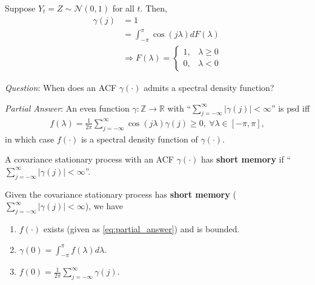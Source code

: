 \documentclass[11pt]{elegantbook}
\begin{document}
\begin{example}
    Suppose $Y_t=Z\sim \mathcal{N}(0,1)$ for all $t$. Then,
    \begin{equation}
        \begin{aligned}
            \gamma(j)&=1\\
            &=\int_{-\pi}^\pi \cos(j\lambda) d F(\lambda)\\
            & \Rightarrow F(\lambda)=
            \left\{\begin{matrix}
                1,&\lambda\geq 0\\
                0,&\lambda<0
            \end{matrix}\right.
        \end{aligned}
        \nonumber
    \end{equation}
\end{example}

\textit{Question}: When does an ACF $\gamma(\cdot)$ admits a spectral density function?

\textit{Partial Answer}: An even function $\gamma: \mathbb{Z}\rightarrow \mathbb{R}$ with ``$\sum_{j=-\infty}^\infty |\gamma(j)|<\infty$'' is psd iff
\begin{equation}
    \begin{aligned}
        f(\lambda)=\frac{1}{2\pi}\sum_{j=-\infty}^\infty \cos\left(j\lambda\right)\gamma(j)\geq 0,\ \forall \lambda\in[-\pi, \pi],
    \end{aligned}
    \label{eq:partial_answer}
\end{equation}
in which case $f(\cdot)$ is a spectral density function of $\gamma(\cdot)$.


\begin{remark}
    A covariance stationary process with an ACF $\gamma(\cdot)$ has \textbf{short memory} if ``$\sum_{j=-\infty}^\infty |\gamma(j)|<\infty$''.
\end{remark}

\begin{proposition}
    Given the covariance stationary process has \textbf{short memory} ($\sum_{j=-\infty}^\infty |\gamma(j)|<\infty$), we have
    \begin{enumerate}
        \item $f(\cdot)$ exists (given as \eqref{eq:partial_answer}) and is bounded.
        \item $\gamma(0)=\int_{-\pi}^\pi f(\lambda) d \lambda$.
        \item $f(0)=\frac{1}{2\pi}\sum_{j=-\infty}^\infty \gamma(j)$.
    \end{enumerate}
\end{proposition}
\end{document}
